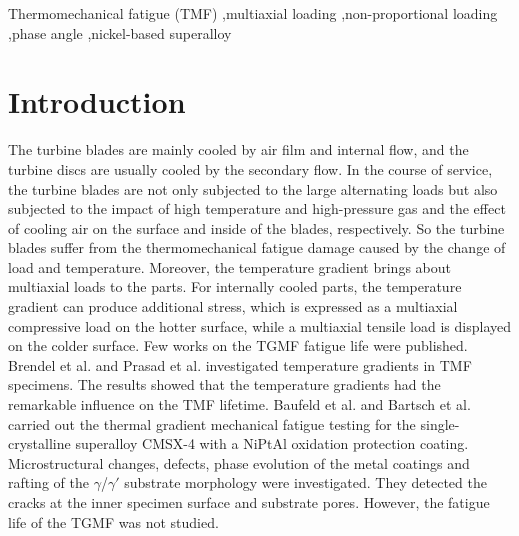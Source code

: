\documentclass[preprint,5p,twocolumn,11pt,sort&compress]{elsarticle}
\begin{document}
\begin{frontmatter}
\begin{abstract}
\end{abstract}

%
\begin{keyword}
Thermomechanical fatigue (TMF) \sep multiaxial loading \sep non-proportional loading \sep phase angle \sep nickel-based superalloy

\end{keyword}
\end{frontmatter}

\section{Introduction}
The turbine blades are mainly cooled by air film and internal flow, and the turbine discs are usually cooled by the secondary flow.
In the course of service, the turbine blades are not only subjected to the large alternating loads but also subjected to the impact of high temperature and high-pressure gas and the effect of cooling air on the surface and inside of the blades, respectively. So the turbine blades suffer from the thermomechanical fatigue damage caused by the change of load and temperature.
Moreover, the temperature gradient brings about multiaxial loads to the parts.
For internally cooled parts, the temperature gradient can produce additional stress, which is expressed as a multiaxial compressive load on the hotter surface, while a multiaxial tensile load is displayed on the colder surface.
Few works on the TGMF fatigue life were published.
Brendel et al. \cite{BRENDEL2008234} and Prasad et al. \cite{PRASAD2013131} investigated temperature gradients in TMF specimens. The results showed that the temperature gradients had the remarkable influence on the TMF lifetime.
Baufeld et al. \cite{BAUFELD2008219} and Bartsch et al. \cite{BARTSCH2008211} carried out the thermal gradient mechanical fatigue testing for the single-crystalline superalloy CMSX-4 with a NiPtAl oxidation protection coating.
Microstructural changes, defects, phase evolution of the metal coatings and rafting of the $\gamma$/$\gamma'$ substrate morphology were investigated. They detected the cracks at the inner specimen surface and substrate pores. However, the fatigue life of the TGMF was not studied.
\end{document}
